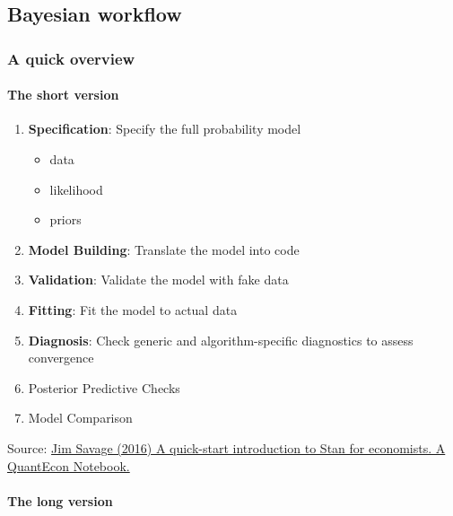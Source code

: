 \documentclass[
  11pt,
]{article}
\providecommand{\tightlist}{%
  \setlength{\itemsep}{0pt}\setlength{\parskip}{0pt}}
\begin{document}
\hypertarget{bayesian-workflow}{%
\subsection{Bayesian workflow}\label{bayesian-workflow}}

\hypertarget{a-quick-overview}{%
\subsubsection{A quick overview}\label{a-quick-overview}}

\hypertarget{the-short-version}{%
\paragraph{The short version}\label{the-short-version}}

\begin{enumerate}
\def\labelenumi{\arabic{enumi}.}
\tightlist
\item
  \textbf{Specification}: Specify the full probability model

  \begin{itemize}
  \tightlist
  \item
    data
  \item
    likelihood
  \item
    priors
  \end{itemize}
\item
  \textbf{Model Building}: Translate the model into code
\item
  \textbf{Validation}: Validate the model with fake data
\item
  \textbf{Fitting}: Fit the model to actual data
\item
  \textbf{Diagnosis}: Check generic and algorithm-specific diagnostics to assess convergence
\item
  Posterior Predictive Checks
\item
  Model Comparison
\end{enumerate}

Source: \href{http://nbviewer.jupyter.org/github/QuantEcon/QuantEcon.notebooks/blob/master/IntroToStan_basics_workflow.ipynb}{Jim Savage (2016) A quick-start introduction to Stan for economists. A QuantEcon Notebook.}

\hypertarget{the-long-version}{%
\paragraph{The long version}\label{the-long-version}}
\end{document}
